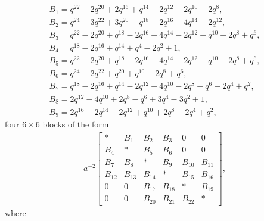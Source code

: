 \documentclass[10pt,a4paper]{amsart}
\numberwithin{equation}{section}
\theoremstyle{definition}
\newcommand{\flac}[2]{#1}
\begin{document}
\begin{gather*}
 B_1 =
\flac{q^{22}}{a^2}-\flac{2q^{20}}{a^2}+\flac{2q^{16}}{a^2}+\flac{q^{14}}{a^2}-\flac{2q^{12}}{a^2}-\flac{2q^{10}}{a^2}+\flac{2q^{8}}{a^2}, \\
 B_2 =
\flac{q^{24}}{a^2}-\flac{3q^{22}}{a^2}+\flac{3q^{20}}{a^2}-\flac{q^{18}}{a^2}+\flac{2q^{16}}{a^2}-\flac{4q^{14}}{a^2}+\flac{2q^{12}}{a^2}, \\
 B_3 =
\flac{q^{22}}{a^2}-\flac{2q^{20}}{a^2}+\flac{q^{18}}{a^2}-\flac{2q^{16}}{a^2}+\flac{4q^{14}}{a^2}-\flac{2q^{12}}{a^2}+\flac{q^{10}}{a^2}-\flac{2q^{8}}{a^2}+\flac{q^{6}}{a^2}, \\
 B_4 =
\flac{q^{18}}{a^2}-\flac{2q^{16}}{a^2}+\flac{q^{14}}{a^2}+\flac{q^{4}}{a^2}-\flac{2q^{2}}{a^2}+\flac{1}{a^2}, \\
 B_5 =
\flac{q^{22}}{a^2}-\flac{2q^{20}}{a^2}+\flac{q^{18}}{a^2}-\flac{2q^{16}}{a^2}+\flac{4q^{14}}{a^2}-\flac{2q^{12}}{a^2}+\flac{q^{10}}{a^2}-\flac{2q^{8}}{a^2}+\flac{q^{6}}{a^2}, \\
 B_6 =
\flac{q^{24}}{a^2}-\flac{2q^{22}}{a^2}+\flac{q^{20}}{a^2}+\flac{q^{10}}{a^2}-\flac{2q^{8}}{a^2}+\flac{q^{6}}{a^2}, \\
 B_7 =
\flac{q^{18}}{a^2}-\flac{2q^{16}}{a^2}+\flac{q^{14}}{a^2}-\flac{2q^{12}}{a^2}+\flac{4q^{10}}{a^2}-\flac{2q^{8}}{a^2}+\flac{q^{6}}{a^2}-\flac{2q^{4}}{a^2}+\flac{q^{2}}{a^2}, \\
 B_8 =
\flac{2q^{12}}{a^2}-\flac{4q^{10}}{a^2}+\flac{2q^{8}}{a^2}-\flac{q^{6}}{a^2}+\flac{3q^{4}}{a^2}-\flac{3q^{2}}{a^2}+\flac{1}{a^2}, \\
 B_9 =
\flac{2q^{16}}{a^2}-\flac{2q^{14}}{a^2}-\flac{2q^{12}}{a^2}+\flac{q^{10}}{a^2}+\flac{2q^{8}}{a^2}-\flac{2q^{4}}{a^2}+\flac{q^{2}}{a^2},
\end{gather*}
four $6 \times 6$ blocks of the form
\begin{align*}
 a^{-2} \begin{bmatrix}
 * & B_1 & B_2 & B_3 & 0 & 0 \\
 B_4 & * & B_5 & B_6 & 0 & 0 \\
 B_7 & B_8 & * & B_9 & B_{10} & B_{11} \\
 B_{12} & B_{13} & B_{14} & * & B_{15} & B_{16} \\
 0 & 0 & B_{17} & B_{18} & * & B_{19} \\
 0 & 0 & B_{20} & B_{21} & B_{22} & *
 \end{bmatrix},
\end{align*}
where
\end{document}
